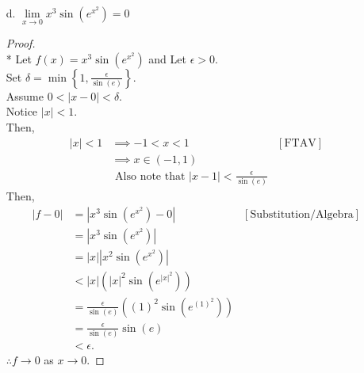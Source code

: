 \documentclass[a4paper]{article}
\newcommand{\eps}{\epsilon}
\newcommand{\del}{\delta}
\begin{document}
\begin{flushleft}
\begin{enumerate}[c.]
            \item [d.] $\lim\limits_{x \to 0} x^3 \sin{(e^{x^2})} = 0$
            
            \begin{proof}\mbox{}\\*
                Let $f(x) = x^3 \sin{(e^{x^2})}$ and Let $\eps > 0$. \\ 
                Set $\del = \min\left\{1, \frac{\eps}{\sin{(e)}}\right\}$. \\
                Assume $0 < \left| x - 0 \right| < \del $. \\
                Notice $\left| x \right| < 1$. \\
                Then, 
                \begin{align*}
                    |x| < 1 &\implies -1 < x < 1 & [\text{FTAV}]\\
                    &\implies x \in (-1,1) &\\
                    &\text{  Also note that } |x-1|<\frac{\eps}{\sin{(e)}}
                \end{align*}
                Then, 
                \begin{align*}
                    |f - 0| &= |x^3 \sin{(e^{x^2})} - 0| & [\text{Substitution/Algebra}]\\
                            &= |x^3 \sin{(e^{x^2})}| \\
                            &= |x||x^2 \sin{(e^{x^2})}| \\
                            &< |x|(|x|^2 \sin{(e^{|x|^2})}) \\
                            &= \frac{\eps}{\sin{(e)}} ({(1)}^2 \sin{(e^{{(1)}^2})}) \\
                            &= \frac{\eps}{\sin{(e)}} \sin{(e)} \\
                            &< \eps.
                \end{align*}
                $\therefore f \to 0$ as $x \to 0$.
            \end{proof}

        \end{enumerate} 

    \end{flushleft}
\end{document}
